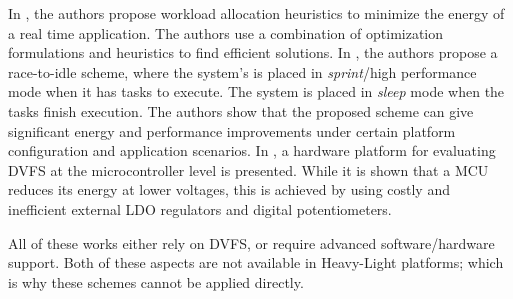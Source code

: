 In \cite{Paterna}, the authors propose workload allocation heuristics to minimize the energy of a real time application. The authors use a combination of optimization formulations and heuristics to find efficient solutions. In \cite{Raghavan2012}, the authors propose a race-to-idle scheme, where the system's is placed in \textit{sprint}/high performance mode when it has tasks to execute. The system is placed in \textit{sleep} mode when the tasks finish execution. The authors show that the proposed scheme can give significant energy and performance improvements under certain platform configuration and application scenarios. In \cite{Salehi2015}, a hardware platform for evaluating DVFS at the microcontroller level is presented. While it is shown that a MCU reduces its energy at lower voltages, this is achieved by using costly and inefficient external LDO regulators and digital potentiometers. 

All of these works either rely on DVFS, or require advanced software/hardware support. Both of these aspects are not available in Heavy-Light platforms; which is why these schemes cannot be applied directly.  
